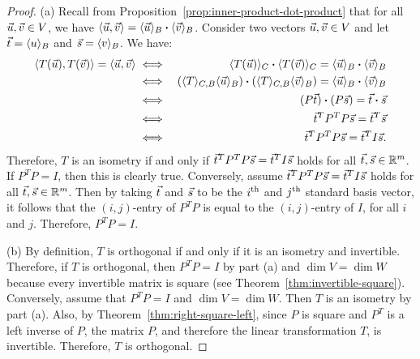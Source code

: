 \documentclass{ximera}
\begin{document}
\begin{proof}
  (a) Recall from Proposition~\ref{prop:inner-product-dot-product}
  that for all $\vec{u},\vec{v}\in V$, we have
  $\langle \vec{u},\vec{v} \rangle = \langle\vec{u}\rangle_B\boldsymbol{\cdot}
  \langle\vec{v}\rangle_B$. Consider two vectors $\vec{u},\vec{v}\in V$
  and let $\vec{t}=\langle u\rangle_B$ and $\vec{s}=\langle v\rangle_B$. We have:
  \begin{eqnarray*}
    \langle T(\vec{u}),T(\vec{v}) \rangle = \langle \vec{u},\vec{v} \rangle
    &\iff& \langle T(\vec{u})\rangle_C\boldsymbol{\cdot} \langle T(\vec{v})\rangle_C
           = \langle\vec{u}\rangle_B\boldsymbol{\cdot} \langle\vec{v}\rangle_B \\
    &\iff& (\langle T\rangle_{C,B}\langle\vec{u}\rangle_B)\boldsymbol{\cdot} (\langle T\rangle_{C,B}\langle\vec{v}\rangle_B)
           = \langle\vec{u}\rangle_B\boldsymbol{\cdot} \langle\vec{v}\rangle_B \\
    &\iff& (P\vec{t})\boldsymbol{\cdot} (P\vec{s})
           = \vec{t}\boldsymbol{\cdot} \vec{s} \\
    &\iff& \vec{t}^T P^T P\vec{s}
           = \vec{t}^T \vec{s} \\
    &\iff& \vec{t}^T P^T P\vec{s}
           = \vec{t}^T I \vec{s}.
  \end{eqnarray*}
  Therefore, $T$ is an isometry if and only if
  $\vec{t}^T P^T P\vec{s} = \vec{t}^T I \vec{s}$ holds for all
  $\vec{t},\vec{s}\in\mathbb{R}^m$. If $P^TP=I$, then this is clearly
  true. Conversely, assume
  $\vec{t}^T P^T P\vec{s} = \vec{t}^T I \vec{s}$ holds for all
  $\vec{t},\vec{s}\in\mathbb{R}^m$. Then by taking $\vec{t}$ and $\vec{s}$
  to be the $i^{\text{th}}$ and $j^{\text{th}}$ standard basis vector, it follows that
  the $(i,j)$-entry of $P^TP$ is equal to the $(i,j)$-entry of $I$,
  for all $i$ and $j$. Therefore, $P^TP=I$.

  (b) By definition, $T$ is orthogonal if and only if it is an
  isometry and invertible. Therefore, if $T$ is orthogonal, then
  $P^TP=I$ by part (a) and $\dim V=\dim W$ because every invertible
  matrix is square (see
  Theorem~\ref{thm:invertible-square}). Conversely, assume that
  $P^TP=I$ and $\dim V=\dim W$. Then $T$ is an isometry by part
  (a). Also, by Theorem~\ref{thm:right-square-left}, since $P$ is
  square and $P^T$ is a left inverse of $P$, the matrix $P$, and
  therefore the linear transformation $T$, is invertible. Therefore,
  $T$ is orthogonal.
\end{proof}
\end{document}
